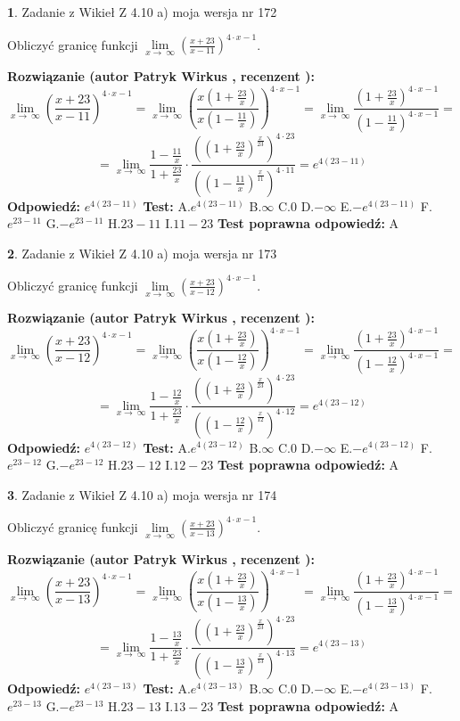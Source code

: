 \documentclass[12pt, a4paper]{article}
\theoremstyle{definition} %
\newtheorem{zad}{}
\newcommand{\zadStart}[1]{\begin{zad}#1\newline}
\newcommand{\zadStop}{\end{zad}}
\newcommand{\rozwStart}[2]{\noindent \textbf{Rozwiązanie (autor #1 , recenzent #2): }\newline}
\newcommand{\rozwStop}{\newline}
\newcommand{\odpStart}{\noindent \textbf{Odpowiedź:}\newline}
\newcommand{\odpStop}{\newline}
\newcommand{\testStart}{\noindent \textbf{Test:}\newline}
\newcommand{\testStop}{\newline}
\newcommand{\kluczStart}{\noindent \textbf{Test poprawna odpowiedź:}\newline}
\newcommand{\kluczStop}{\newline}
\begin{document}
\zadStart{Zadanie z Wikieł Z 4.10 a) moja wersja nr 172}


Obliczyć granicę funkcji  $\lim\limits_{x\to\ \infty}(\frac{x+23}{x-11})^{4\cdot x-1}$.
\zadStop
\rozwStart{Patryk Wirkus}{}
$$\lim\limits_{x\to\ \infty}(\frac{x+23}{x-11})^{4\cdot x-1} = \lim\limits_{x\to\ \infty}(\frac{x(1+\frac{23}{x})}{x(1-\frac{11}{x})})^{4\cdot x-1}=\lim\limits_{x\to\ \infty}\frac{(1+\frac{23}{x})^{4\cdot x-1}}{(1-\frac{11}{x})^{4\cdot x-1}}=$$
$$=\lim\limits_{x\to\ \infty}\frac{1-\frac{11}{x}}{1+\frac{23}{x}}\cdot\frac{((1+\frac{23}{x})^{\frac{x}{23}})^{4\cdot23}}{((1-\frac{11}{x})^{\frac{x}{11}})^{4\cdot11}}=e^{4(23-11)}$$
\rozwStop
\odpStart
$e^{4(23-11)}$
\odpStop
\testStart
A.$e^{4(23-11)}$ B.$\infty$ C.$0$ D.$-\infty$ E.$-e^{4(23-11)}$
F.$e^{23-11}$ G.$-e^{23-11}$
H.$23-11$
I.$11-23$
\testStop
\kluczStart
A
\kluczStop



\zadStart{Zadanie z Wikieł Z 4.10 a) moja wersja nr 173}


Obliczyć granicę funkcji  $\lim\limits_{x\to\ \infty}(\frac{x+23}{x-12})^{4\cdot x-1}$.
\zadStop
\rozwStart{Patryk Wirkus}{}
$$\lim\limits_{x\to\ \infty}(\frac{x+23}{x-12})^{4\cdot x-1} = \lim\limits_{x\to\ \infty}(\frac{x(1+\frac{23}{x})}{x(1-\frac{12}{x})})^{4\cdot x-1}=\lim\limits_{x\to\ \infty}\frac{(1+\frac{23}{x})^{4\cdot x-1}}{(1-\frac{12}{x})^{4\cdot x-1}}=$$
$$=\lim\limits_{x\to\ \infty}\frac{1-\frac{12}{x}}{1+\frac{23}{x}}\cdot\frac{((1+\frac{23}{x})^{\frac{x}{23}})^{4\cdot23}}{((1-\frac{12}{x})^{\frac{x}{12}})^{4\cdot12}}=e^{4(23-12)}$$
\rozwStop
\odpStart
$e^{4(23-12)}$
\odpStop
\testStart
A.$e^{4(23-12)}$ B.$\infty$ C.$0$ D.$-\infty$ E.$-e^{4(23-12)}$
F.$e^{23-12}$ G.$-e^{23-12}$
H.$23-12$
I.$12-23$
\testStop
\kluczStart
A
\kluczStop



\zadStart{Zadanie z Wikieł Z 4.10 a) moja wersja nr 174}


Obliczyć granicę funkcji  $\lim\limits_{x\to\ \infty}(\frac{x+23}{x-13})^{4\cdot x-1}$.
\zadStop
\rozwStart{Patryk Wirkus}{}
$$\lim\limits_{x\to\ \infty}(\frac{x+23}{x-13})^{4\cdot x-1} = \lim\limits_{x\to\ \infty}(\frac{x(1+\frac{23}{x})}{x(1-\frac{13}{x})})^{4\cdot x-1}=\lim\limits_{x\to\ \infty}\frac{(1+\frac{23}{x})^{4\cdot x-1}}{(1-\frac{13}{x})^{4\cdot x-1}}=$$
$$=\lim\limits_{x\to\ \infty}\frac{1-\frac{13}{x}}{1+\frac{23}{x}}\cdot\frac{((1+\frac{23}{x})^{\frac{x}{23}})^{4\cdot23}}{((1-\frac{13}{x})^{\frac{x}{13}})^{4\cdot13}}=e^{4(23-13)}$$
\rozwStop
\odpStart
$e^{4(23-13)}$
\odpStop
\testStart
A.$e^{4(23-13)}$ B.$\infty$ C.$0$ D.$-\infty$ E.$-e^{4(23-13)}$
F.$e^{23-13}$ G.$-e^{23-13}$
H.$23-13$
I.$13-23$
\testStop
\kluczStart
A
\kluczStop
\end{document}
